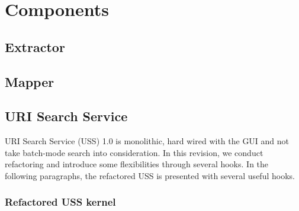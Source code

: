\documentclass[letterpaper,10pt,english]{sphinxmanual}
\begin{document}
\chapter{Components}
\label{index:components}

\section{Extractor}
\label{docs/extractor:extractor}\label{docs/extractor::doc}\label{docs/extractor:id1}

\section{Mapper}
\label{docs/mapper:mapper}\label{docs/mapper::doc}\label{docs/mapper:id1}

\section{URI Search Service}
\label{docs/uss:uss}\label{docs/uss::doc}\label{docs/uss:uri-search-service}
URI Search Service (USS) 1.0 is monolithic, hard wired with the GUI and not take batch-mode search into consideration. In this revision, we conduct refactoring and introduce some flexibilities through several hooks. In the following paragraphs, the refactored USS is presented with several useful hooks.


\subsection{Refactored USS kernel}
\label{docs/uss:refactored-uss-kernel}
\end{document}
